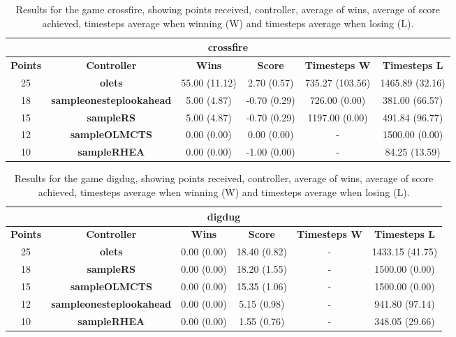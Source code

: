 \begin{table*}[!t]
\begin{center}
\begin{tabular}{|c|c|c|c|c|c|}
\multicolumn{6}{c}{\textbf{crossfire}}\\
\hline
\textbf{Points} & \textbf{Controller} & \textbf{Wins} &  \textbf{Score} & \textbf{Timesteps W} & \textbf{Timesteps L}\\
\hline
25 & \textbf{olets} & 55.00 (11.12) & 2.70 (0.57) & 735.27 (103.56) & 1465.89 (32.16)
 \\
\hline
18 & \textbf{sampleonesteplookahead} & 5.00 (4.87) & -0.70 (0.29) & 726.00 (0.00) & 381.00 (66.57)
 \\
\hline
15 & \textbf{sampleRS} & 5.00 (4.87) & -0.70 (0.29) & 1197.00 (0.00) & 491.84 (96.77)
 \\
\hline
12 & \textbf{sampleOLMCTS} & 0.00 (0.00) & 0.00 (0.00) &  -  & 1500.00 (0.00)
 \\
\hline
10 & \textbf{sampleRHEA} & 0.00 (0.00) & -1.00 (0.00) &  -  & 84.25 (13.59)
 \\
\hline
\end{tabular}
\caption{Results for the game crossfire, showing points received, controller, average of wins, average of score achieved, timesteps average when winning (W) and timesteps average when losing (L).}
\label{tab:weights}
\end{center}
\end{table*}
\begin{table*}[!t]
\begin{center}
\begin{tabular}{|c|c|c|c|c|c|}
\multicolumn{6}{c}{\textbf{digdug}}\\
\hline
\textbf{Points} & \textbf{Controller} & \textbf{Wins} &  \textbf{Score} & \textbf{Timesteps W} & \textbf{Timesteps L}\\
\hline
25 & \textbf{olets} & 0.00 (0.00) & 18.40 (0.82) &  -  & 1433.15 (41.75)
 \\
\hline
18 & \textbf{sampleRS} & 0.00 (0.00) & 18.20 (1.55) &  -  & 1500.00 (0.00)
 \\
\hline
15 & \textbf{sampleOLMCTS} & 0.00 (0.00) & 15.35 (1.06) &  -  & 1500.00 (0.00)
 \\
\hline
12 & \textbf{sampleonesteplookahead} & 0.00 (0.00) & 5.15 (0.98) &  -  & 941.80 (97.14)
 \\
\hline
10 & \textbf{sampleRHEA} & 0.00 (0.00) & 1.55 (0.76) &  -  & 348.05 (29.66)
 \\
\hline
\end{tabular}
\caption{Results for the game digdug, showing points received, controller, average of wins, average of score achieved, timesteps average when winning (W) and timesteps average when losing (L).}
\label{tab:weights}
\end{center}
\end{table*}
